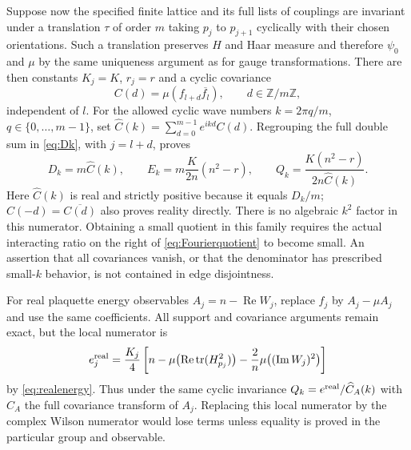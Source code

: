 \documentclass[11pt]{article}
\theoremstyle{definition}
\newcommand{\tr}{\operatorname{tr}}
\newcommand{\Rea}{\operatorname{Re}}
\newcommand{\Ima}{\operatorname{Im}}
\begin{document}
Suppose now the specified finite lattice and its full lists of couplings
are invariant under a translation $\tau$ of order $m$ taking $p_j$ to
$p_{j+1}$ cyclically with their chosen orientations. Such a translation
preserves $H$ and Haar measure and therefore $\psi_0$ and $\mu$ by the
same uniqueness argument as for gauge transformations. There are then
constants $K_j=K$, $r_j=r$ and a cyclic covariance
\[
 C(d)=\mu(f_{l+d}\overline{f_l}),\qquad d\in\mathbb Z/m\mathbb Z,
\]
independent of $l$. For the allowed cyclic wave numbers
$k=2\pi q/m$, $q\in\{0,\ldots,m-1\}$, set
$\widehat C(k)=\sum_{d=0}^{m-1}e^{ikd}C(d)$. Regrouping the full
double sum in \eqref{eq:Dk}, with $j=l+d$, proves
\begin{equation}\label{eq:Fourierquotient}
 D_k=m\widehat C(k),\qquad
 E_k=m\frac{K}{2n}(n^2-r),\qquad
 Q_k=\frac{K(n^2-r)}{2n\widehat C(k)}.
\end{equation}
Here $\widehat C(k)$ is real and strictly positive because it equals
$D_k/m$; $C(-d)=\overline{C(d)}$ also proves reality directly.
There is no algebraic $k^2$ factor in this numerator. Obtaining a
small quotient in this family requires the actual interacting ratio
on the right of \eqref{eq:Fourierquotient} to become small. An assertion
that all covariances vanish, or that the denominator has prescribed
small-$k$ behavior, is not contained in edge disjointness.

For real plaquette energy observables $A_j=n-\Rea W_j$, replace $f_j$
by $A_j-\mu A_j$ and use the same coefficients. All support and covariance
arguments remain exact, but the local numerator is
\begin{equation}\label{eq:real-localnumerator}
 e_j^{\rm real}
 =\frac{K_j}{4}\left[n-\mu\bigl(\Rea\tr(H_{p_j}^2)\bigr)
                       -\frac2n\mu\bigl((\Ima W_j)^2\bigr)\right]
\end{equation}
by \eqref{eq:realenergy}. Thus under the same cyclic invariance
$Q_k=e^{\rm real}/\widehat C_A(k)$ with $\widehat C_A$ the full covariance
transform of $A_j$. Replacing this local numerator by the complex
Wilson numerator would lose terms unless equality is proved in the
particular group and observable.
\end{document}

